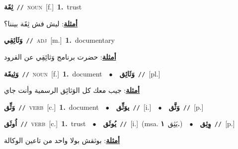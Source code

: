 \documentclass[10pt,a4paper,twoside]{article} %
\begin{document}
\begin{multicols}{2}
{{{{{{{\setlength\topsep{0pt}\textbf{\foreignlanguage{arabic}{ثِقَة}}\ {\color{gray}\texttt{//}\color{black}}\ \textsc{noun}\ [f.]\ \textbf{1.}~trust\  \begin{flushright}\color{gray}\foreignlanguage{arabic}{\textbf{\underline{\foreignlanguage{arabic}{أمثلة}}}: ليش فش ثِقَة بيننا؟}\end{flushright}\color{black}} \vspace{2mm}

{\setlength\topsep{0pt}\textbf{\foreignlanguage{arabic}{وَثَائِقِي}}\ {\color{gray}\texttt{//}\color{black}}\ \textsc{adj}\ [m.]\ \textbf{1.}~documentary\  \begin{flushright}\color{gray}\foreignlanguage{arabic}{\textbf{\underline{\foreignlanguage{arabic}{أمثلة}}}: حضرت برنامج وَثائِقِي عن القرود}\end{flushright}\color{black}} \vspace{2mm}

{\setlength\topsep{0pt}\textbf{\foreignlanguage{arabic}{وَثِيقَة}}\ {\color{gray}\texttt{//}\color{black}}\ \textsc{noun}\ [f.]\ \textbf{1.}~document\ \ $\bullet$\ \ \setlength\topsep{0pt}\textbf{\foreignlanguage{arabic}{وَثَائِق}}\ {\color{gray}\texttt{//}\color{black}}\ [pl.]\  \begin{flushright}\color{gray}\foreignlanguage{arabic}{\textbf{\underline{\foreignlanguage{arabic}{أمثلة}}}: جيب معك كل الوَثائِق الرسمية وأنت جاي}\end{flushright}\color{black}} \vspace{2mm}

{\setlength\topsep{0pt}\textbf{\foreignlanguage{arabic}{وَثِّق}}\ {\color{gray}\texttt{//}\color{black}}\ \textsc{verb}\ [c.]\ \textbf{1.}~document\ \ $\bullet$\ \ \setlength\topsep{0pt}\textbf{\foreignlanguage{arabic}{يوَثِّق}}\ {\color{gray}\texttt{//}\color{black}}\ [i.]\ \ $\bullet$\ \ \setlength\topsep{0pt}\textbf{\foreignlanguage{arabic}{وَثَّق}}\ {\color{gray}\texttt{//}\color{black}}\ [p.]\ 

{\setlength\topsep{0pt}\textbf{\foreignlanguage{arabic}{اُوثَق}}\ {\color{gray}\texttt{//}\color{black}}\ \textsc{verb}\ [c.]\ \textbf{1.}~trust\ \ $\bullet$\ \ \setlength\topsep{0pt}\textbf{\foreignlanguage{arabic}{يُوثَق}}\ {\color{gray}\texttt{//}\color{black}}\ [i.]\ \color{gray}(msa. \foreignlanguage{arabic}{يَثِق}~\foreignlanguage{arabic}{\textbf{١.}})\color{black}\ \ $\bullet$\ \ \setlength\topsep{0pt}\textbf{\foreignlanguage{arabic}{وِثِق}}\ {\color{gray}\texttt{//}\color{black}}\ [p.]\  \begin{flushright}\color{gray}\foreignlanguage{arabic}{\textbf{\underline{\foreignlanguage{arabic}{أمثلة}}}: بوثقش بولا واحد من تاعين الوكالة}\end{flushright}\color{black}} \vspace{2mm}

}}}}}}}
\end{multicols}
\end{document}
